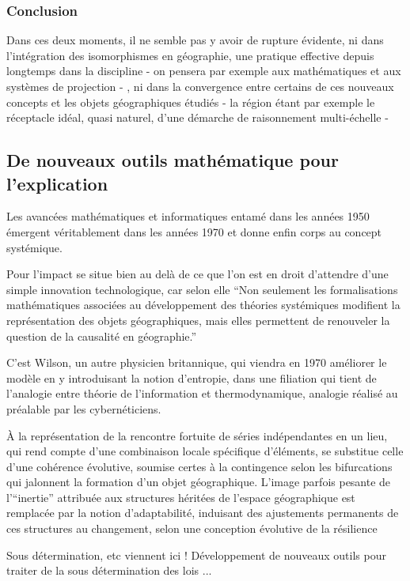 \subsubsection{Conclusion}
Dans ces deux moments, il ne semble pas y avoir de rupture évidente, ni dans l'intégration des isomorphismes en géographie, une pratique effective depuis longtemps dans la discipline - on pensera par exemple aux mathématiques et aux systèmes de projection - , ni dans la convergence entre certains de ces nouveaux concepts et les objets géographiques étudiés - la région étant par exemple le réceptacle idéal, quasi naturel, d'une démarche de raisonnement multi-échelle -

\subsection{De nouveaux outils mathématique pour l'explication}

Les avancées mathématiques et informatiques entamé dans les années 1950 émergent véritablement dans les années 1970 et donne enfin corps au concept systémique.

Pour \textcite[137]{Pumain2002} l'impact se situe bien au delà de ce que l'on est en droit d'attendre d'une simple innovation technologique, car selon elle \enquote{Non seulement les formalisations mathématiques associées au développement des théories systémiques modifient la représentation des objets géographiques, mais elles permettent de renouveler la question de la causalité en géographie.}

C'est Wilson, un autre physicien britannique, qui viendra en 1970 améliorer le modèle en y introduisant la notion d'entropie, dans une filiation qui tient de l'analogie entre théorie de l'information et thermodynamique, analogie réalisé au préalable par les cybernéticiens.

\textcite[137]{Pumain2002} À la représentation de la rencontre fortuite de séries indépendantes en un lieu, qui rend compte d’une combinaison locale spécifique d’éléments, se substitue celle d’une cohérence évolutive, soumise certes à la contingence selon les bifurcations qui jalonnent la formation d’un objet géographique. L’image parfois pesante de l’\enquote{inertie} attribuée aux structures héritées de l’espace géographique est remplacée par la notion d’adaptabilité, induisant des ajustements permanents de ces structures au changement, selon une conception évolutive de la résilience

Sous détermination, etc viennent ici !
Développement de nouveaux outils pour traiter de la sous détermination des lois ...

